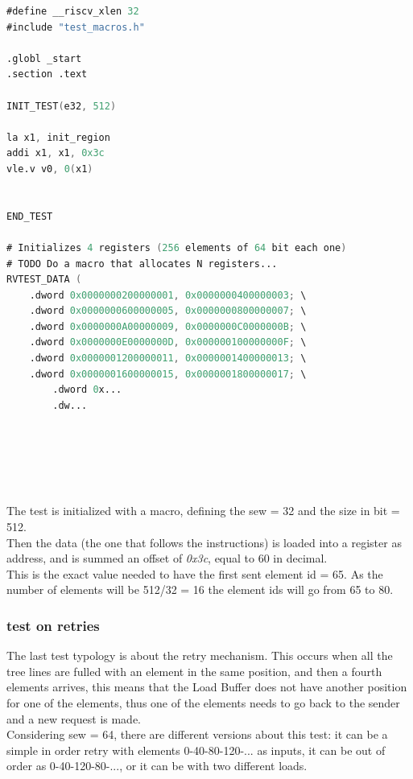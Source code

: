 \linespread{1}
\begin{lstlisting}[language=Verilog,style=verilog-style, backgroundcolor=\color{lyel_palette}, frame=tl]
#define __riscv_xlen 32
#include "test_macros.h"

.globl _start
.section .text

INIT_TEST(e32, 512)

la x1, init_region
addi x1, x1, 0x3c
vle.v v0, 0(x1)


END_TEST

# Initializes 4 registers (256 elements of 64 bit each one)
# TODO Do a macro that allocates N registers...
RVTEST_DATA (
	.dword 0x0000000200000001, 0x0000000400000003; \
	.dword 0x0000000600000005, 0x0000000800000007; \
	.dword 0x0000000A00000009, 0x0000000C0000000B; \
	.dword 0x0000000E0000000D, 0x000000100000000F; \
	.dword 0x0000001200000011, 0x0000001400000013; \
	.dword 0x0000001600000015, 0x0000001800000017; \
        .dword 0x...
        .dw...  

     
 

        
\end{lstlisting}
\linespread{1.2}

The test is initialized with a macro, defining the sew = 32 and the size in bit = 512.\\
Then the data (the one that follows the instructions) is loaded into a register as address, and is summed an offset of \emph{0x3c}, equal to 60 in decimal.\\ This is the exact value needed to have the first sent element id = 65. As the number of elements will be 512/32 = 16 the element ids will go from 65 to 80.\\

\subsubsection{test on retries}
The last test typology is about the retry mechanism. This occurs when all the tree lines are fulled with an element in the same position, and then a fourth elements arrives, this means that the Load Buffer does not have another position for one of the elements, thus one of the elements needs to go back to the sender and a new request is made.\\

Considering sew = 64, there are different versions about this test: it can be a simple in order retry with elements 0-40-80-120-... as inputs, it can be out of order as 0-40-120-80-..., or it can be with two different loads.\\

